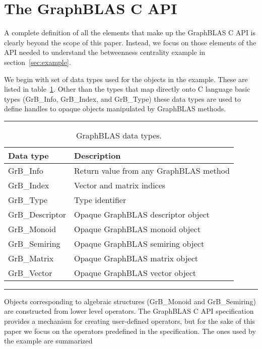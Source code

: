 \section{The GraphBLAS C API}
\label{sec:Capi}

A complete definition of all the elements that make up the GraphBLAS C API
is clearly beyond the scope of this paper.  Instead, we focus on those
elements of the API needed to understand the betweenness centrality
example in section~\ref{sec:example}. 

We begin with set of data types used for the objects in the example.
These are listed in table~\ref{Tab:GrBdataTypes}.  Other than the types that map directly onto
C language basic types ({\sf GrB\_Info}, {\sf GrB\_Index}, and {\sf GrB\_Type}) these data types
are used to define handles to opaque objects manipulated by GraphBLAS methods.
\begin{table}[h]
\hrule
\begin{center}
\caption{GraphBLAS data types.}
\label{Tab:GrBdataTypes}
\begin{tabular}{lp{5.25cm}}
Data type                     & Description  \\
\hline
	{\sf GrB\_Info}           & Return value from any GraphBLAS method \\
	{\sf GrB\_Index}          & Vector and matrix indices \\
	{\sf GrB\_Type}		      & Type identifier \vspace{.1cm} \\ 
	{\sf GrB\_Descriptor}     & Opaque GraphBLAS descriptor object \\
	{\sf GrB\_Monoid}         & Opaque GraphBLAS monoid object  \\
	{\sf GrB\_Semiring}       & Opaque GraphBLAS semiring object  \\
	{\sf GrB\_Matrix}         & Opaque GraphBLAS matrix object \\
	{\sf GrB\_Vector}         & Opaque GraphBLAS vector object \\
\end{tabular}
\end{center}
\hrule
\end{table}
Objects corresponding to algebraic structures ({\sf GrB\_Monoid} and {\sf GrB\_Semiring}) are constructed from lower level
operators. The GraphBLAS C API specification provides a mechanism for creating user-defined operators, but for the 
sake of this paper we focus on the operators predefined in the specification.  The ones used by the example are summarized
